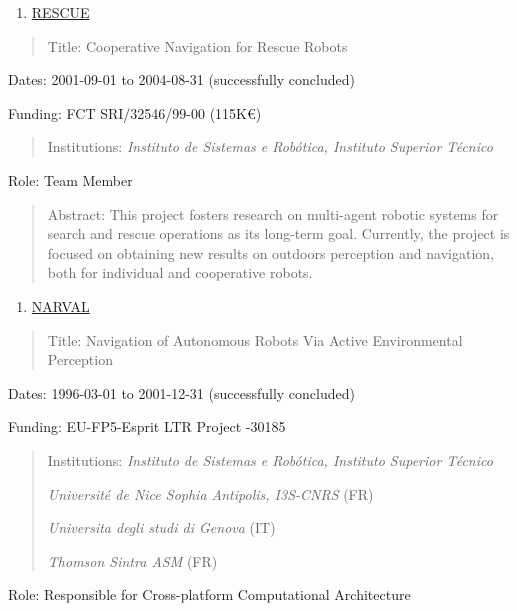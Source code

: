 \begin{enumerate}
\def\labelenumi{\arabic{enumi}.}
\setcounter{enumi}{18}
\item
  \ul{RESCUE}
\end{enumerate}

\begin{quote}
Title: Cooperative Navigation for Rescue Robots
\end{quote}

Dates: 2001-09-01 to 2004-08-31 (successfully concluded)

Funding: FCT SRI/32546/99-00 (115K€)

\begin{quote}
Institutions: \emph{Instituto de Sistemas e Robótica, Instituto Superior
Técnico}
\end{quote}

Role: Team Member

\begin{quote}
Abstract: This project fosters research on multi-agent robotic systems
for search and rescue operations as its long-term goal. Currently, the
project is focused on obtaining new results on outdoors perception and
navigation, both for individual and cooperative robots.
\end{quote}

\begin{enumerate}
\def\labelenumi{\arabic{enumi}.}
\setcounter{enumi}{19}
\item
  \ul{NARVAL}
\end{enumerate}

\begin{quote}
Title: Navigation of Autonomous Robots Via Active Environmental
Perception
\end{quote}

Dates: 1996-03-01 to 2001-12-31 (successfully concluded)

Funding: EU-FP5-Esprit LTR Project -30185

\begin{quote}
Institutions: \emph{Instituto de Sistemas e Robótica, Instituto Superior
Técnico}

\emph{Université de Nice Sophia Antipolis, I3S-CNRS} (FR)

\emph{Universita degli studi di Genova} (IT)

\emph{Thomson Sintra ASM} (FR)
\end{quote}

Role: Responsible for Cross-platform Computational Architecture

